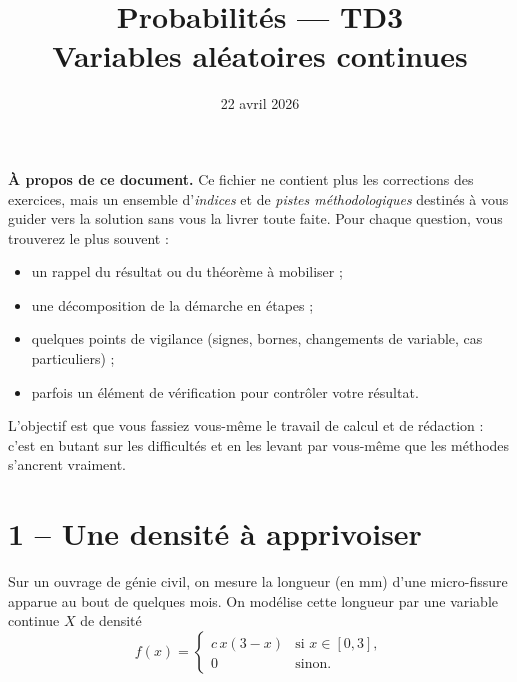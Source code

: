 


\title{\sffamily\bfseries Probabilités --- TD3\\[0.3em]
  \Large Variables aléatoires continues}
\author{}
\date{22 avril 2026}


\sffamily
\maketitle

\begin{solution}
  \textbf{À propos de ce document.}
  Ce fichier ne contient plus les corrections des exercices,
  mais un ensemble d'\emph{indices} et de \emph{pistes
  méthodologiques} destinés à vous guider vers la solution sans vous
  la livrer toute faite. Pour chaque question, vous trouverez le
  plus souvent :
  \begin{itemize}
    \item un rappel du résultat ou du théorème à mobiliser ;
    \item une décomposition de la démarche en étapes ;
    \item quelques points de vigilance (signes, bornes, changements
    de variable, cas particuliers) ;
    \item parfois un élément de vérification pour contrôler votre
    résultat.
  \end{itemize}
  L'objectif est que vous fassiez vous-même le travail de calcul et
  de rédaction : c'est en butant sur les difficultés et en les
  levant par vous-même que les méthodes s'ancrent vraiment.
\end{solution}


\section*{1 -- Une densité à apprivoiser}

Sur un ouvrage de génie civil, on mesure la longueur (en mm) d'une
micro-fissure apparue au bout de quelques mois.
On modélise cette longueur par une variable continue $X$ de densité
\[
  f(x)=
  \begin{cases}
    c\,x(3-x) & \text{si } x\in[0,3],\\
    0 & \text{sinon.}
  \end{cases}
\]

